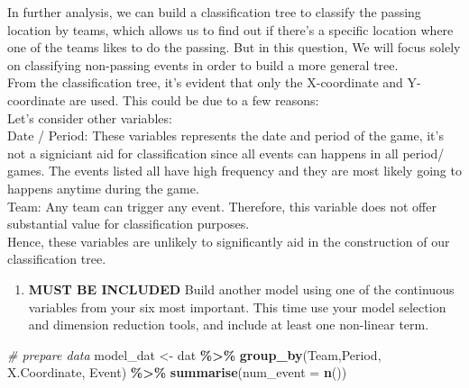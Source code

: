 \documentclass[
  a3paper,
]{article}
\newenvironment{Shaded}{\begin{snugshade}}{\end{snugshade}}
\newcommand{\AttributeTok}[1]{\textcolor[rgb]{0.13,0.29,0.53}{#1}}
\newcommand{\CommentTok}[1]{\textcolor[rgb]{0.56,0.35,0.01}{\textit{#1}}}
\newcommand{\FunctionTok}[1]{\textcolor[rgb]{0.13,0.29,0.53}{\textbf{#1}}}
\newcommand{\NormalTok}[1]{#1}
\newcommand{\OtherTok}[1]{\textcolor[rgb]{0.56,0.35,0.01}{#1}}
\newcommand{\SpecialCharTok}[1]{\textcolor[rgb]{0.81,0.36,0.00}{\textbf{#1}}}
\providecommand{\tightlist}{%
  \setlength{\itemsep}{0pt}\setlength{\parskip}{0pt}}
\begin{document}
In further analysis, we can build a classification tree to classify the
passing location by teams, which allows us to find out if there's a
specific location where one of the teams likes to do the passing. But in
this question, We will focus solely on classifying non-passing events in
order to build a more general tree.\\

From the classification tree, it's evident that only the X-coordinate
and Y-coordinate are used. This could be due to a few reasons:\\

Let's consider other variables:\\

Date / Period: These variables represents the date and period of the
game, it's not a signiciant aid for classification since all events can
happens in all period/ games. The events listed all have high frequency
and they are most likely going to happens anytime during the game.\\

Team: Any team can trigger any event. Therefore, this variable does not
offer substantial value for classification purposes.\\

Hence, these variables are unlikely to significantly aid in the
construction of our classification tree.\\

\newpage

\vspace{2cm}

\begin{enumerate}
\def\labelenumi{\arabic{enumi})}
\setcounter{enumi}{3}
\tightlist
\item
  \textbf{MUST BE INCLUDED} Build another model using one of the
  continuous variables from your six most important. This time use your
  model selection and dimension reduction tools, and include at least
  one non-linear term.
\end{enumerate}

\begin{Shaded}
\begin{Highlighting}[]
\CommentTok{\# prepare data}
\NormalTok{model\_dat }\OtherTok{\textless{}{-}}\NormalTok{ dat }\SpecialCharTok{\%\textgreater{}\%} \FunctionTok{group\_by}\NormalTok{(Team,Period, X.Coordinate, Event) }\SpecialCharTok{\%\textgreater{}\%} \FunctionTok{summarise}\NormalTok{(}\AttributeTok{num\_event =} \FunctionTok{n}\NormalTok{())}
\end{Highlighting}
\end{Shaded}
\end{document}
